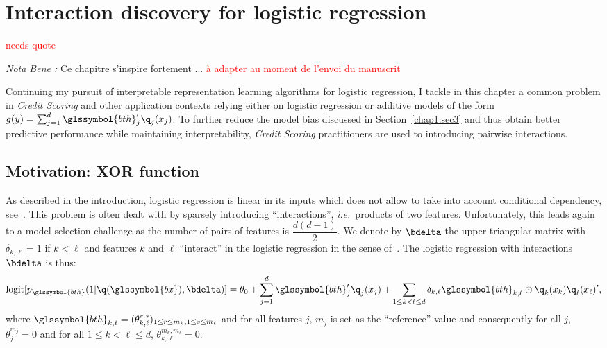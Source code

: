 \chapter{Interaction discovery for logistic regression} \label{chap5}

\minitoc


\textcolor{red}{needs quote}

\textit{Nota Bene :} Ce chapitre s'inspire fortement ... \textcolor{red}{à adapter au moment de l'envoi du manuscrit}


Continuing my pursuit of interpretable representation learning algorithms for logistic regression, I tackle in this chapter a common problem in \textit{Credit Scoring} and other application contexts relying either on logistic regression or additive models of the form $g(y) = \sum_{j=1}^d \glssymbol{bth}_j' \q_j(x_j)$. To further reduce the model bias discussed in Section~\ref{chap1:sec3} and thus obtain better predictive performance while maintaining interpretability, \textit{Credit Scoring} practitioners are used to introducing pairwise interactions.


\section{Motivation: XOR function}

As described in the introduction, logistic regression is linear in its inputs which does not allow to take into account conditional dependency, see~\cite{berry2010testing}. This problem is often dealt with by sparsely introducing ``interactions'', \textit{i.e.}\ products of two features. Unfortunately, this leads again to a model selection challenge as the number of pairs of features is $\dfrac{d(d-1)}{2}$. We denote by $\bdelta$ the upper triangular matrix with $\delta_{k,\ell} = 1$ if $k < \ell$ and features $k$ and $\ell$ ``interact'' in the logistic regression in the sense of~\cite{berry2010testing}. The logistic regression with interactions $\bdelta$ is thus:
\begin{equation} \label{eq:reglog_sans}
\text{logit}[p_{\glssymbol{bth}}(1|\q(\glssymbol{bx}),\bdelta)] = \theta_{0} + \sum_{j=1}^d \glssymbol{bth}_j' \q_j(x_j) + \sum_{1 \leq k < \ell \leq d} \delta_{k,\ell} \glssymbol{bth}_{k,\ell} \odot \q_k(x_k) \q_\ell(x_\ell)',
\end{equation}
where $\glssymbol{bth}_{k,\ell} = (\theta_{k,\ell}^{r,s})_{1 \leq r \leq m_k, 1 \leq s \leq m_\ell}$ and for all features $j$, $m_j$ is set as the ``reference'' value and consequently for all $j$, $\theta_{j}^{m_j}=0$ and for all $1 \leq k < \ell \leq d$, $\theta_{k,\ell}^{m_k,m_{\ell}}=0$.


